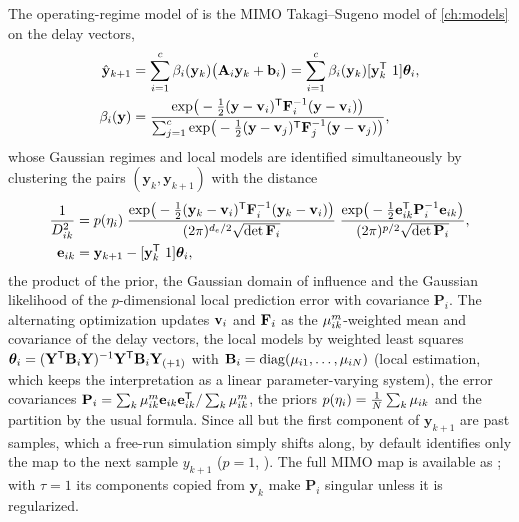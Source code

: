 The operating-regime model of \cite{abonyi:2004:chaotic} is the MIMO Takagi--Sugeno model of \cref{ch:models} on the delay vectors,
\begin{equation}
  \begin{aligned}
  \hat{\mathbf{y}}_{k+1}&=\sum_{i=1}^{c}\beta_i(\mathbf{y}_k)\big(\mathbf{A}_i\mathbf{y}_k+\mathbf{b}_i\big)=\sum_{i=1}^{c}\beta_i(\mathbf{y}_k)[\mathbf{y}_k\T\ 1]\boldsymbol\theta_i,\\
  \beta_i(\mathbf{y})&=\frac{\exp\!\big(-\frac12(\mathbf{y}-\vi)\T\Fi^{-1}(\mathbf{y}-\vi)\big)}{\sum_{j=1}^{c}\exp\!\big(-\frac12(\mathbf{y}-\mathbf{v}_j)\T\mathbf{F}_j^{-1}(\mathbf{y}-\mathbf{v}_j)\big)},
  \end{aligned}
  \label{eq:ts:regimemodel}
\end{equation}
whose Gaussian regimes and local models are identified simultaneously by clustering the pairs $(\mathbf{y}_k,\mathbf{y}_{k+1})$ with the distance
\begin{equation}
  \begin{aligned}
  \frac{1}{D^2_{ik}}&=p(\eta_i)\;
  \frac{\exp\!\big(-\frac12(\mathbf{y}_k-\vi)\T\Fi^{-1}(\mathbf{y}_k-\vi)\big)}{(2\pi)^{d_e/2}\sqrt{\det\Fi}}\;
  \frac{\exp\!\big(-\frac12\mathbf{e}_{ik}\T\mathbf{P}_i^{-1}\mathbf{e}_{ik}\big)}{(2\pi)^{p/2}\sqrt{\det\mathbf{P}_i}},\\
  \mathbf{e}_{ik}&=\mathbf{y}_{k+1}-[\mathbf{y}_k\T\ 1]\boldsymbol\theta_i,
  \end{aligned}
  \label{eq:ts:chaosdist}
\end{equation}
the product of the prior, the Gaussian domain of influence and the Gaussian likelihood of the $p$-dimensional local prediction error with covariance $\mathbf{P}_i$. The alternating optimization updates $\mathbf{v}_i$ and $\mathbf{F}_i$ as the $\mu_{ik}^m$-weighted mean and covariance of the delay vectors, the local models by weighted least squares $\boldsymbol\theta_i=(\mathbf{Y}^{\mathsf{T}}\mathbf{B}_i\mathbf{Y})^{-1}\mathbf{Y}^{\mathsf{T}}\mathbf{B}_i\mathbf{Y}_{(+1)}$ with $\mathbf{B}_i=\operatorname{diag}(\mu_{i1},\dots,\mu_{iN})$ (local estimation, which keeps the interpretation as a linear parameter-varying system), the error covariances $\mathbf{P}_i=\sum_k\mu_{ik}^m\mathbf{e}_{ik}\mathbf{e}_{ik}^{\mathsf{T}}/\sum_k\mu_{ik}^m$, the priors $p(\eta_i)=\frac1N\sum_k\mu_{ik}$ and the partition by the usual formula. Since all but the first component of $\mathbf{y}_{k+1}$ are past samples, which a free-run simulation simply shifts along,  by default identifies only the map to the next sample $y_{k+1}$ ($p=1$, ). The full MIMO map is available as ; with $\tau=1$ its components copied from $\mathbf{y}_k$ make $\mathbf{P}_i$ singular unless it is regularized.

